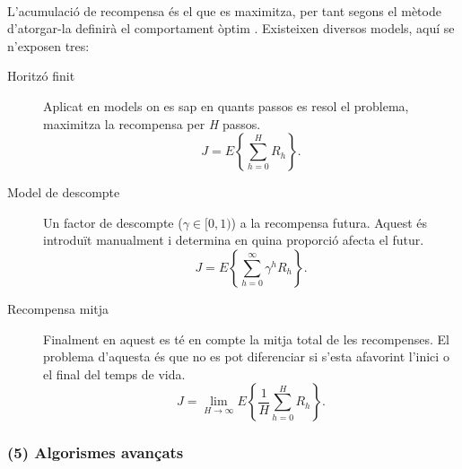 \documentclass[12pt,a4paper,final,twoside]{article}
\begin{document}

\paragraph{}L'acumulació de recompensa és el que es maximitza, per tant segons el mètode d'atorgar-la definirà el comportament òptim \cite{Kober2009}. Existeixen diversos models, aquí se n'exposen tres:
\begin{description}


\item[Horitzó finit] Aplicat en models on es sap en quants passos es resol el problema, maximitza la recompensa per \textit{H} passos.
\begin{equation}
J=E\left\{ \sum_{h=0}^{H} R_{h} \right\}.
\end{equation}

\item[Model de descompte] Un factor de descompte ($\gamma\in[0,1)$) a la recompensa futura. Aquest és introduït manualment i determina en quina proporció afecta el futur.
\begin{equation}
J=E\left\{ \sum_{h=0}^{\infty} \gamma^h R_{h} \right\}.
\end{equation}

\item[Recompensa mitja] Finalment en aquest es té en compte la mitja total de les recompenses. El problema d'aquesta és que no es pot diferenciar si s'esta afavorint l'inici o el final del temps de vida.
\begin{equation}
J=\lim_{H \to \infty} E\left\{ \frac{1}{H}\sum_{h=0}^{H} R_{h} \right\}.
\end{equation} 

\end{description}


\subsubsection*{(5) Algorismes avançats}
\end{document}
